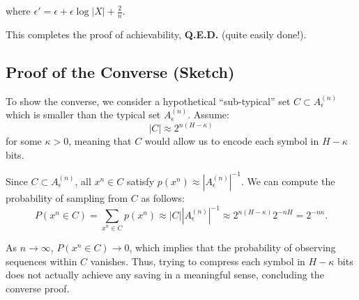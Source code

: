 where \( \epsilon' = \epsilon + \epsilon \log |X| + \frac{2}{n} \).

This completes the proof of achievability, \textbf{Q.E.D.} (quite easily done!).

\subsection{Proof of the Converse (Sketch)}

To show the converse, we consider a hypothetical “sub-typical” set \( C \subset A^{(n)}_\epsilon \) which is smaller than the typical set \( A^{(n)}_\epsilon \). Assume:
\[
    |C| \approx 2^{n(H - \kappa)}
\]
for some \( \kappa > 0 \), meaning that \( C \) would allow us to encode each symbol in \( H - \kappa \) bits.

Since \( C \subset A^{(n)}_\epsilon \), all \( x^n \in C \) satisfy \( p(x^n) \approx |A^{(n)}_\epsilon|^{-1} \). We can compute the probability of sampling from \( C \) as follows:
\[
    P(x^n \in C) = \sum_{x^n \in C} p(x^n) \approx |C| |A^{(n)}_\epsilon|^{-1} \approx 2^{n(H - \kappa)} 2^{-nH} = 2^{-n \kappa}.
\]

As \( n \to \infty \), \( P(x^n \in C) \to 0 \), which implies that the probability of observing sequences within \( C \) vanishes. Thus, trying to compress each symbol in \( H - \kappa \) bits does not actually achieve any saving in a meaningful sense, concluding the converse proof.















